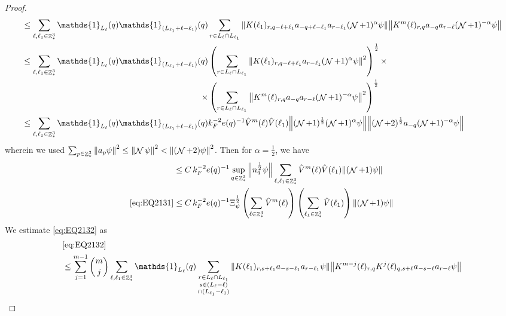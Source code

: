 \documentclass[sn-mathphys, Numbered ,a4paper]{sn-jnl}%
\DeclareMathOperator{\Z}{\mathbb{Z}}
\DeclareMathOperator{\NN}{\mathcal{N}}
\newcommand{\half}{\frac{1}{2}}
\theoremstyle{plain}
\theoremstyle{definition}
\theoremstyle{remark}
\theoremstyle{plain}
\theoremstyle{definition}
\theoremstyle{remark}
\begin{document}
\begin{proof}
\begin{alignat}{2}
		&\leq \sum\limits_{\ell, \ell_1\in \Z^3_*} \mathds{1}_{L_{\ell}}(q) \mathds{1}_{(L_{\ell_1}+\ell-\ell_1)}(q) \sum\limits_{r\in L_{\ell} \cap L_{\ell_1}} \norm{ K(\ell_1)_{r,q-\ell+\ell_1} a_{-q+\ell-\ell_1} a_{r-\ell_1}(\NN+1)^{\alpha}\psi}\norm{ K^m(\ell)_{r,q} a_{-q}a_{r-\ell} (\NN+1)^{-\alpha} \psi }\nonumber\\
		&\leq \sum\limits_{\ell, \ell_1\in \Z^3_*} \mathds{1}_{L_{\ell}}(q) \begin{aligned}[t]
			\mathds{1}_{(L_{\ell_1}+\ell-\ell_1)}(q) &\left(\sum\limits_{r\in L_{\ell} \cap L_{\ell_1}} \norm{ K(\ell_1)_{r,q-\ell+\ell_1} a_{r-\ell_1}(\NN+1)^{\alpha} \psi}^2\right)^\half \times\nonumber\\ \times &\left(\sum\limits_{r\in L_{\ell} \cap L_{\ell_1}} \norm{ K^m(\ell)_{r,q} a_{-q}a_{r-\ell} (\NN+1)^{-\alpha} \psi }^2 \right)^\half \end{aligned}\nonumber\\
		&\leq \sum\limits_{\ell, \ell_1\in \Z^3_*} \mathds{1}_{L_{\ell}}(q) \mathds{1}_{(L_{\ell_1}+\ell-\ell_1)}(q)  k_{F}^{-2} e(q)^{-1} \hat{V}^{m}(\ell) \hat{V}(\ell_1) \norm{ (\NN+1)^\half(\NN+1)^{\alpha} \psi} \norm{ (\NN+2)^\half a_{-q} (\NN+1)^{-\alpha} \psi }\nonumber
	\end{alignat} 
	wherein we used $\sum_{p\in \Z^3_*}\norm{a_p \psi}^2\leq\norm{\NN\psi}^2<\norm{(\NN+2)\psi}^2$. Then for $\alpha =  \half $, we have 
	\begin{align}
		&\leq C\,k_{F}^{-2} e(q)^{-1}  \sup\limits_{q\in \Z^3_*}\norm{n_q^\half \psi } \sum\limits_{\ell, \ell_1\in \Z^3_*}  \hat{V}^{m}(\ell) \hat{V}(\ell_1) \norm{ (\NN+1) \psi} \nonumber\\
		\eqref{eq:EQ2131}&\leq C\, k_{F}^{-2} e(q)^{-1}  \Xi_{\psi}^\half \left(\sum\limits_{\ell\in \Z^3_*} \hat{V}^{m}(\ell) \right)\left(  \sum\limits_{ \ell_1\in \Z^3_*} \hat{V}(\ell_1)  \right) \norm{ (\NN+1) \psi}\label{eq:estEQ2131} 
	\end{align}  
	We estimate \eqref{eq:EQ2132} as
	\begin{align}
		&\eqref{eq:EQ2132}\nonumber\\
		&\leq \sum\limits_{j=1}^{m-1} {{m}\choose j} \sum\limits_{\ell, \ell_1\in \Z^3_*}\mathds{1}_{L_{\ell}}(q) \sum\limits_{\substack{r\in L_{\ell} \cap L_{\ell_1}\\ s \in (L_{\ell}-\ell) \\\cap (L_{\ell_1}-\ell_1)}} \norm{ K(\ell_1)_{r,s+\ell_1}a_{-s-\ell_1} a_{r-\ell_1} \psi}\norm{ K^{m-j}(\ell)_{r,q} K^{j}(\ell)_{q,s+\ell} a_{-s-\ell}a_{r-\ell}  \psi }\nonumber\\

\end{align}
\end{proof}
\end{document}
